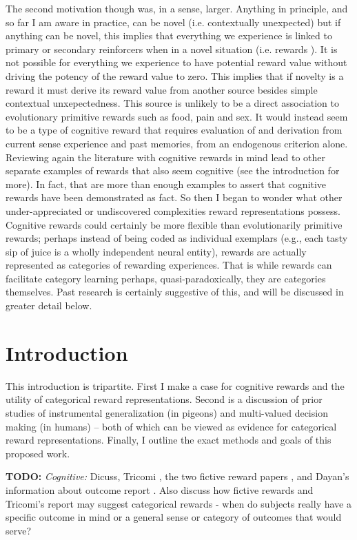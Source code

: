 \documentclass[doc,12pt]{apa}        %
\begin{document}
The second motivation though was, in a sense, larger.  Anything in principle, and so far I am aware in practice, can be novel (i.e. contextually unexpected) but if anything can be novel, this implies that everything we experience is linked to primary or secondary reinforcers when in a novel situation (i.e. rewards ).  It is not possible for everything we experience to have potential reward value without driving the potency of the reward value to zero.  This implies that if novelty is a reward it must derive its reward value from another source besides simple contextual unxepectedness.  This source is unlikely to be a direct association to evolutionary primitive rewards such as food, pain and sex.  It would instead seem to be a type of cognitive reward that requires evaluation of and derivation from current sense experience and past memories, from an endogenous criterion alone.  Reviewing again the literature with cognitive rewards in mind lead to other separate examples of rewards that also seem cognitive (see the introduction for more).  In fact, that are more than enough examples to assert that cognitive rewards have been demonstrated as fact.  So then I began to wonder what other under-appreciated or undiscovered complexities reward representations possess.  Cognitive rewards could certainly be more flexible than evolutionarily primitive rewards; perhaps instead of being coded as individual exemplars (e.g., each tasty sip of juice is a wholly independent neural entity), rewards are actually represented as categories of rewarding experiences.  That is while rewards can facilitate category learning perhaps, quasi-paradoxically, they are categories themselves.  Past research is certainly suggestive of this, and will be discussed in greater detail below.  

\section{Introduction} %
\label{sec:introduction}
This introduction is tripartite.  First I make a case for cognitive rewards and the utility of categorical reward representations.  Second is a discussion of prior studies of instrumental generalization (in pigeons) and multi-valued decision making (in humans) -- both of which can be viewed as evidence for categorical reward representations.  Finally, I outline the exact methods and goals of this proposed work.

\textbf{TODO:}
\emph{Cognitive:} Dicuss, Tricomi \cite{Tricomi:2008p6663}, the two fictive reward papers \cite{Hayden:2009p6545,Lohrenz:2007p7240,Dayan:2006p6539}, and Dayan's information about outcome report \cite{BrombergMartin:2009p7220}.  Also discuss how fictive rewards and Tricomi's report may suggest categorical rewards - when do subjects really have a specific outcome in mind or a general sense or category of outcomes that would serve?
\end{document}
